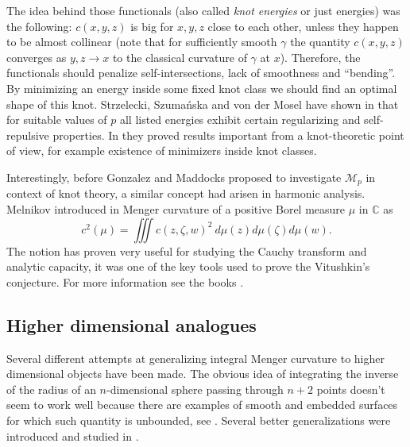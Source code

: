 \documentclass[11pt]{amsart}
\newcommand{\Mp}{\mathscr{M}_p}
\theoremstyle{definition}
\begin{document}
	The idea behind those functionals (also called \emph{knot energies} or just energies) was the following: $c(x,y,z)$ is big for $x,y,z$ close to each other, unless they happen to be almost collinear (note that for sufficiently smooth $\gamma$ the quantity $c(x,y,z)$ converges as $y,z\rightarrow x$ to the classical curvature of $\gamma$ at $x$). Therefore, the functionals  should penalize self-intersections, lack of smoothness and ``bending''. By minimizing an energy inside some fixed knot class we should find an optimal shape of this knot. Strzelecki, Szumańska and von der Mosel have shown in \cite{strzelecki2007rectifiable,strzelecki2009geometric,strzelecki2010regularizing} that for suitable values of $p$ all listed energies exhibit certain regularizing and self-repulsive properties. In \cite{strzelecki2013some} they proved results important from a knot-theoretic point of view, for example existence of minimizers inside knot classes.
	
	Interestingly, before Gonzalez and Maddocks proposed to investigate $\Mp$ in context of knot theory, a similar concept had arisen in harmonic analysis. Melnikov introduced in \cite{mel1995analytic} Menger curvature of a positive Borel measure	$\mu$ in $\mathbb{C}$ as
	\begin{equation*}
	c^2(\mu)=\iiint c(z,\zeta,w)^2\ d\mu(z)d\mu(\zeta)d\mu(w).
	\end{equation*}
	The notion has proven very useful for studying the Cauchy transform and analytic capacity, it was one of the key tools used to prove the Vitushkin's conjecture. For more information see the books \cite{pajot2002analytic,tolsa2014analytic}.
	
	\subsection*{Higher dimensional analogues}
	
	Several different attempts at generalizing integral Menger curvature to higher dimensional objects have been made. The obvious idea of integrating the inverse of the radius of an $n$-dimensional sphere passing through $n+2$ points doesn't seem to work well because there are examples of smooth and embedded surfaces for which such quantity is unbounded, see \cite[Appendix B]{strzelecki2011integral}. Several better generalizations were introduced and studied in \cite{lerman2011high,lerman2009high,strzelecki2011integral,kolasinski2012thesis,kolasinski2015geometric,kolasinski2015compactness}. 
	
\end{document}
